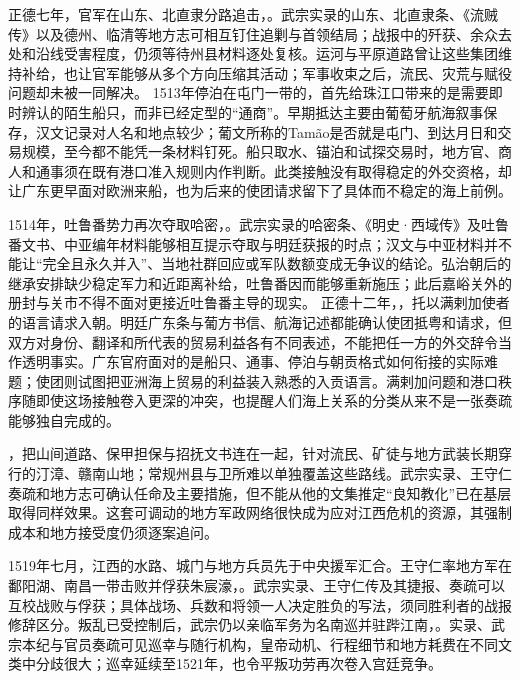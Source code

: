 正德七年，官军在山东、北直隶分路追击，。武宗实录的山东、北直隶条、《流贼传》以及德州、临清等地方志可相互钉住追剿与首领结局；战报中的歼获、余众去处和沿线受害程度，仍须等待州县材料逐处复核。运河与平原道路曾让这些集团维持补给，也让官军能够从多个方向压缩其活动；军事收束之后，流民、灾荒与赋役问题却未被一同解决。
1513年停泊在屯门一带的，首先给珠江口带来的是需要即时辨认的陌生船只，而非已经定型的“通商”。早期抵达主要由葡萄牙航海叙事保存，汉文记录对人名和地点较少；葡文所称的Tamão是否就是屯门、到达月日和交易规模，至今都不能凭一条材料钉死。船只取水、锚泊和试探交易时，地方官、商人和通事须在既有港口准入规则内作判断。此类接触没有取得稳定的外交资格，却让广东更早面对欧洲来船，也为后来的使团请求留下了具体而不稳定的海上前例。

1514年，吐鲁番势力再次夺取哈密，。武宗实录的哈密条、《明史·西域传》及吐鲁番文书、中亚编年材料能够相互提示夺取与明廷获报的时点；汉文与中亚材料并不能让“完全且永久并入”、当地社群回应或军队数额变成无争议的结论。弘治朝后的继承安排缺少稳定军力和近距离补给，吐鲁番因而能够重新施压；此后嘉峪关外的册封与关市不得不面对更接近吐鲁番主导的现实。
正德十二年，，托以满剌加使者的语言请求入朝。明廷广东条与葡方书信、航海记述都能确认使团抵粤和请求，但双方对身份、翻译和所代表的贸易利益各有不同表述，不能把任一方的外交辞令当作透明事实。广东官府面对的是船只、通事、停泊与朝贡格式如何衔接的实际难题；使团则试图把亚洲海上贸易的利益装入熟悉的入贡语言。满剌加问题和港口秩序随即使这场接触卷入更深的冲突，也提醒人们海上关系的分类从来不是一张奏疏能够独自完成的。

，把山间道路、保甲担保与招抚文书连在一起，针对流民、矿徒与地方武装长期穿行的汀漳、赣南山地；常规州县与卫所难以单独覆盖这些路线。武宗实录、王守仁奏疏和地方志可确认任命及主要措施，但不能从他的文集推定“良知教化”已在基层取得同样效果。这套可调动的地方军政网络很快成为应对江西危机的资源，其强制成本和地方接受度仍须逐案追问。

1519年七月，江西的水路、城门与地方兵员先于中央援军汇合。王守仁率地方军在鄱阳湖、南昌一带击败并俘获朱宸濠，。武宗实录、王守仁传及其捷报、奏疏可以互校战败与俘获；具体战场、兵数和将领一人决定胜负的写法，须同胜利者的战报修辞区分。叛乱已受控制后，武宗仍以亲临军务为名南巡并驻跸江南，。实录、武宗本纪与官员奏疏可见巡幸与随行机构，皇帝动机、行程细节和地方耗费在不同文类中分歧很大；巡幸延续至1521年，也令平叛功劳再次卷入宫廷竞争。



